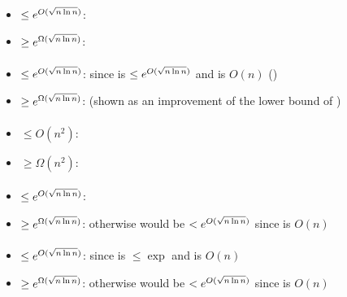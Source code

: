 \paragraph{\TDFA{}\tto\ODFA}\label{cost:2DFAto1DFAu}
\begin{itemize}
	\item $\le e^{O(\sqrt{n\ln n})}$: \cite{Chr86}
	\item $\ge e^{\Omega(\sqrt{n\ln n})}$: \cite{Chr86}
\end{itemize}
\paragraph{\TDFA{}\tto\ONFA}\label{cost:2DFAto1NFAu}
\begin{itemize}
	\item $\le e^{O(\sqrt{n\ln n})}$: since \hyperref[cost:2DFAto1DFAu]{\TDFA{}\tto\ODFA} is $\le e^{O(\sqrt{n\ln n})}$ and \ODFA{}\tto\ONFA is $O(n)$ (\cite{Chr86})
	\item $\ge e^{\Omega(\sqrt{n\ln n})}$: \cite{Chr86} (shown as an improvement of the lower bound of \hyperref[cost:2DFAto1DFAu]{\TDFA{}\tto\ODFA})
\end{itemize}
\paragraph{\ONFA{}\tto\TDFA}\label{cost:1NFAto2DFAu}
\begin{itemize}
	\item $\le O(n^2)$: \cite{Chr86}
	\item $\ge \Omega(n^2)$: \cite{Chr86}
\end{itemize}
\paragraph{\TNFA{}\tto\ODFA}\label{cost:2NFAto1DFAu}
\begin{itemize}
	\item $\le e^{O(\sqrt{n\ln n})}$: \cite{MerPig01}
	\item $\ge e^{\Omega(\sqrt{n\ln n})}$: otherwise \hyperref[cost:2DFAto1DFAu]{\TDFA{}\tto\ODFA} would be $<e^{O(\sqrt{n\ln n})}$ since \TDFA{}\tto\TNFA is $O(n)$
\end{itemize}
\paragraph{\TNFA{}\tto\ONFA}
\begin{itemize}
	\item $\le e^{O(\sqrt{n\ln n})}$: since \hyperref[cost:2NFAto1DFAu]{\TNFA{}\tto\ODFA} is $\le\exp$ and \ODFA{}\tto\ONFA is $O(n)$
	\item $\ge e^{\Omega(\sqrt{n\ln n})}$: otherwise \hyperref[cost:2DFAto1NFAu]{\TDFA{}\tto\ONFA} would be $<e^{O(\sqrt{n\ln n})}$ since \TDFA{}\tto\TNFA is $O(n)$
\end{itemize}
